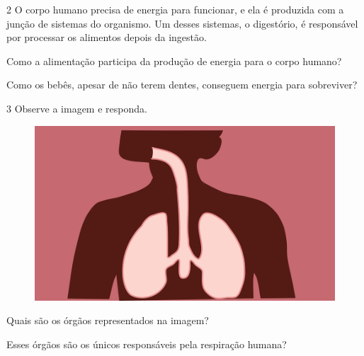 \num{2} O corpo humano precisa de energia para funcionar, e ela é
produzida com a junção de sistemas do organismo. Um desses sistemas, o
digestório, é responsável por processar os alimentos depois da ingestão.

\begin{escolha}
\item Como a alimentação participa da produção de energia para o corpo humano?


\item Como os bebês, apesar de não terem dentes, conseguem energia para
sobreviver?

\end{escolha}

\pagebreak
\num{3} Observe a imagem e responda.

\begin{figure}[htpb!]
\includegraphics[width=.5\textwidth]{./imgs/img1.png}
\end{figure}

\begin{escolha}
\item Quais são os órgãos representados na imagem?


\item Esses órgãos são os únicos responsáveis pela respiração humana?

\end{escolha}

